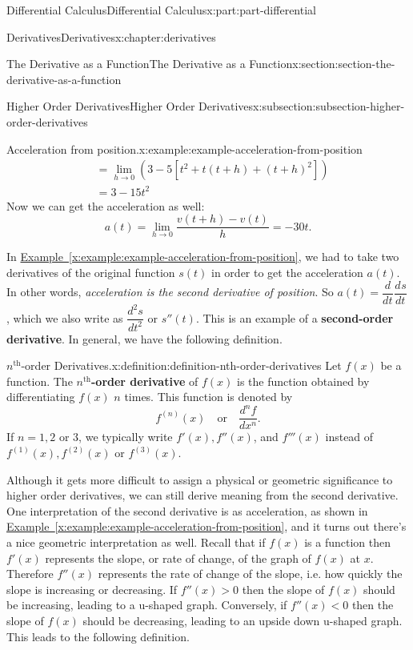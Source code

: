 \documentclass[twoside,10pt,]{book}
\newcommand{\xreffont}{\relax}
\newcommand{\terminology}[1]{\textbf{#1}}
\numberwithin{equation}{part}
\newcommand{\dv}[3][]{\dfrac{d^{#1} #2}{d #3^{#1}}}
\begin{document}
\begin{partptx}{Differential Calculus}{}{Differential Calculus}{}{}{x:part:part-differential}
\begin{chapterptx}{Derivatives}{}{Derivatives}{}{}{x:chapter:derivatives}
\begin{sectionptx}{The Derivative as a Function}{}{The Derivative as a Function}{}{}{x:section:section-the-derivative-as-a-function}
\begin{subsectionptx}{Higher Order Derivatives}{}{Higher Order Derivatives}{}{}{x:subsection:subsection-higher-order-derivatives}
\begin{example}{Acceleration from position.}{x:example:example-acceleration-from-position}
\begin{align*}
& = \lim_{h\to0}(3 - 5[t^{2} + t(t+h) + (t+h)^{2}]) \\
& = 3 - 15t^{2} 
\end{align*}
Now we can get the acceleration as well:%
\begin{equation*}
a(t) = \lim_{h\to0}\frac{v(t+h) - v(t)}{h} = -30t.
\end{equation*}
%
\end{example}
In \hyperref[x:example:example-acceleration-from-position]{Example~{\xreffont\ref{x:example:example-acceleration-from-position}}}, we had to take two derivatives of the original function \(s(t)\) in order to get the acceleration \(a(t)\). In other words, \emph{acceleration is the second derivative of position}. So \(a(t) = \dv{}{t}\dv{s}{t}\), which we also write as \(\dv[2]{s}{t}\) or \(s''(t)\). This is an example of a \terminology{second-order derivative}. In general, we have the following definition.%
\begin{definition}{\(n^{\text{th}}\)-order Derivatives.}{x:definition:definition-nth-order-derivatives}%
%
Let \(f(x)\) be a function. The \terminology{\(n^{\text{th}}\)-order derivative} of \(f(x)\) is the function obtained by differentiating \(f(x)\) \(n\) times. This function is denoted by%
\begin{equation*}
f^{(n)}(x)\quad\text{or}\quad\dv[n]{f}{x}.
\end{equation*}
If \(n=1, 2\) or \(3\), we typically write \(f'(x), f''(x)\), and \(f'''(x)\) instead of \(f^{(1)}(x), f^{(2)}(x)\) or \(f^{(3)}(x)\).%
\end{definition}
Although it gets more difficult to assign a physical or geometric significance to higher order derivatives, we can still derive meaning from the second derivative. One interpretation of the second derivative is as acceleration, as shown in \hyperref[x:example:example-acceleration-from-position]{Example~{\xreffont\ref{x:example:example-acceleration-from-position}}}, and it turns out there's a nice geometric interpretation as well. Recall that if \(f(x)\) is a function then \(f'(x)\) represents the slope, or rate of change, of the graph of \(f(x)\) at \(x\). Therefore \(f''(x)\) represents the rate of change of the slope, i.e. how quickly the slope is increasing or decreasing. If \(f''(x) >0\) then the slope of \(f(x)\) should be increasing, leading to a u-shaped graph. Conversely, if \(f''(x) <0\) then the slope of \(f(x)\) should be decreasing, leading to an upside down u-shaped graph. This leads to the following definition.%

\end{subsectionptx}
\end{sectionptx}
\end{chapterptx}
\end{partptx}
\end{document}
